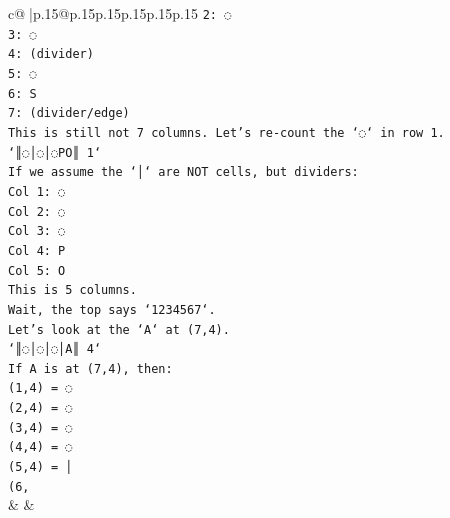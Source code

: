\documentclass{article}
\begin{document}
{\begin{supertabular}{c@{$\;$}|p{.15\linewidth}@{}p{.15\linewidth}p{.15\linewidth}p{.15\linewidth}p{.15\linewidth}p{.15\linewidth}}
{{{\texttt{2: ◌} \\
\texttt{3: ◌} \\
\texttt{4: (divider)} \\
\texttt{5: ◌} \\
\texttt{6: S} \\
\texttt{7: (divider/edge)} \\
\texttt{This is still not 7 columns. Let's re{-}count the `◌` in row 1.} \\
\texttt{`║◌│◌│◌PO║ 1`} \\
\texttt{If we assume the `│` are NOT cells, but dividers:} \\
\texttt{Col 1: ◌} \\
\texttt{Col 2: ◌} \\
\texttt{Col 3: ◌} \\
\texttt{Col 4: P} \\
\texttt{Col 5: O} \\
\texttt{This is 5 columns.} \\
\texttt{Wait, the top says `1234567`.} \\
\texttt{Let's look at the `A` at (7,4).} \\
\texttt{`║◌│◌│◌│A║ 4`} \\
\texttt{If A is at (7,4), then:} \\
\texttt{(1,4) = ◌} \\
\texttt{(2,4) = ◌} \\
\texttt{(3,4) = ◌} \\
\texttt{(4,4) = ◌} \\
\texttt{(5,4) = │} \\
\texttt{(6,} \\
            }
        }
    }
    & & \\ \\


\end{supertabular}}
\end{document}
